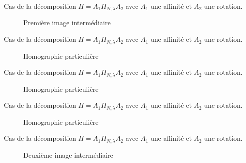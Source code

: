 \documentclass[c,12pt]{beamer}
\newcommand{\Arrow}{{ \raisebox{10\height}{\scalebox{1}{$\longrightarrow$}}}}
\begin{document}
  \begin{frame}
  Cas de la décomposition $H=A_1H_{N,\lambda}A_2$ avec $A_1$ une affinité et $A_2$ une rotation.
  \begin{figure}
   \caption{Première image intermédiaire}
  \end{figure}
  \end{frame}
  
  \begin{frame}
  Cas de la décomposition $H=A_1H_{N,\lambda}A_2$ avec $A_1$ une affinité et $A_2$ une rotation.
  \begin{figure}
   \Arrow
   \caption{Homographie particulière}
  \end{figure}
  \end{frame}
  
  \begin{frame}
  Cas de la décomposition $H=A_1H_{N,\lambda}A_2$ avec $A_1$ une affinité et $A_2$ une rotation.
  \begin{figure}
   \Arrow
   \caption{Homographie particulière}
  \end{figure}
  \end{frame}
  
  \begin{frame}
  Cas de la décomposition $H=A_1H_{N,\lambda}A_2$ avec $A_1$ une affinité et $A_2$ une rotation.
  \begin{figure}
   \Arrow
   \caption{Homographie particulière}
  \end{figure}
  \end{frame}
  
  \begin{frame}
  Cas de la décomposition $H=A_1H_{N,\lambda}A_2$ avec $A_1$ une affinité et $A_2$ une rotation.
  \begin{figure}
   \caption{Deuxième image intermédiaire}
  \end{figure}
  \end{frame}
  
\end{document}
